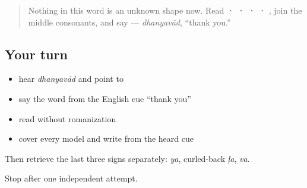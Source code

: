 \label{lesson:MR-W03-dhanyavad-write}



\begin{quote}
Nothing in this word is an unknown shape now. Read \textbf{ ·  ·  ·  · }, join the middle consonants, and say \textbf{} — \emph{dhanyavād}, \textquotedblleft{}thank you.\textquotedblright{}
\end{quote}

\subsection*{Your turn}
\begin{itemize}
\raggedright
  \item hear \emph{dhanyavād} and point to \textbf{}
  \item say the word from the English cue \textquotedblleft{}thank you\textquotedblright{}
  \item read \textbf{} without romanization
  \item cover every model and write \textbf{} from the heard cue
\end{itemize}

Then retrieve the last three signs separately: \emph{ya}, curled-back \emph{ḷa}, \emph{va}.

\begin{tcolorbox}[breakable,colback=teal!4,colframe=teal!35!black,title={Before you move on}]
Stop after one independent attempt.
\end{tcolorbox}
